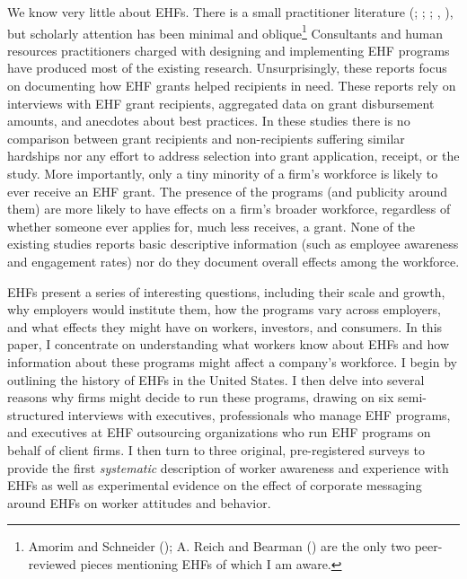 \documentclass[
  11pt,
  oneside]{article}
\begin{document}
We know very little about EHFs. There is a small practitioner literature (; ; ; , ), but scholarly attention has been minimal and oblique\footnote{Amorim and Schneider (); A. Reich and Bearman () are the only two peer-reviewed pieces mentioning EHFs of which I am aware.} Consultants and human resources practitioners charged with designing and implementing EHF programs have produced most of the existing research. Unsurprisingly, these reports focus on documenting how EHF grants helped recipients in need. These reports rely on interviews with EHF grant recipients, aggregated data on grant disbursement amounts, and anecdotes about best practices. In these studies there is no comparison between grant recipients and non-recipients suffering similar hardships nor any effort to address selection into grant application, receipt, or the study. More importantly, only a tiny minority of a firm's workforce is likely to ever receive an EHF grant. The presence of the programs (and publicity around them) are more likely to have effects on a firm's broader workforce, regardless of whether someone ever applies for, much less receives, a grant. None of the existing studies reports basic descriptive information (such as employee awareness and engagement rates) nor do they document overall effects among the workforce.

EHFs present a series of interesting questions, including their scale and growth, why employers would institute them, how the programs vary across employers, and what effects they might have on workers, investors, and consumers. In this paper, I concentrate on understanding what workers know about EHFs and how information about these programs might affect a company's workforce. I begin by outlining the history of EHFs in the United States. I then delve into several reasons why firms might decide to run these programs, drawing on six semi-structured interviews with executives, professionals who manage EHF programs, and executives at EHF outsourcing organizations who run EHF programs on behalf of client firms. I then turn to three original, pre-registered surveys to provide the first \emph{systematic} description of worker awareness and experience with EHFs as well as experimental evidence on the effect of corporate messaging around EHFs on worker attitudes and behavior.
\end{document}
